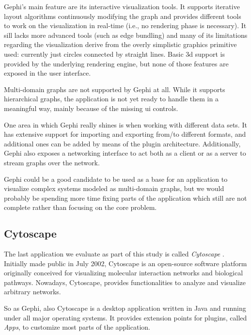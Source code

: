 Gephi's main feature are its interactive visualization tools. It supports iterative layout algorithms continuously modifying the graph and provides different tools to work on the visualization in real-time (i.e., no rendering phase is necessary). It sill lacks more advanced tools (such as edge bundling) and many of its limitations regarding the visualization derive from the overly simplistic graphics primitive used: currently just circles connected by straight lines. Basic \gls{3d} support is provided by the underlying rendering engine, but none of those features are exposed in the user interface.

Multi-domain graphs are not supported by Gephi at all. While it supports hierarchical graphs, the application is not yet ready to handle them in a meaningful way, mainly because of the missing \gls{ui} controls.

One area in which Gephi really shines is when working with different data sets. It has extensive support for importing and exporting from/to different formats, and additional ones can be added by means of the plugin architecture. Additionally, Gephi also exposes a networking interface to act both as a client or as a server to stream graphs over the network.

Gephi could be a good candidate to be used as a base for an application to visualize complex systems modeled as multi-domain graphs, but we would probably be spending more time fixing parts of the application which still are not complete rather than focusing on the core problem.


\subsection{Cytoscape}

The last application we evaluate as part of this study is called \emph{Cytoscape} \cite{cytoscape}. Initially made public in July 2002, Cytoscape is an open-source software platform originally conceived for visualizing molecular interaction networks and biological pathways. Nowadays, Cytoscape, provides functionalities to analyze and visualize arbitrary networks.

So as Gephi, also Cytoscape is a desktop application written in Java and running under all major operating systems. It provides extension points for plugins, called \emph{Apps}, to customize most parts of the application.

